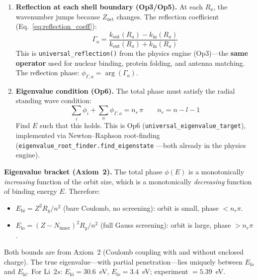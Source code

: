 \begin{enumerate}
\item \textbf{Reflection at each shell boundary (Op3/Op5).}
At each $R_a$, the wavenumber jumps because
$Z_{\text{net}}$ changes.  The reflection coefficient
(Eq.~\ref{eq:reflection_coeff}):\vspace{-4pt}
\begin{equation}
    \Gamma_a = \frac{k_{\text{out}}(R_a)
    - k_{\text{in}}(R_a)}
    {k_{\text{out}}(R_a) + k_{\text{in}}(R_a)}
\end{equation}
This is \texttt{universal\_reflection()}
from the physics engine (Op3)---the
\textbf{same operator} used for nuclear binding,
protein folding, and antenna matching.
The reflection phase: $\phi_{\Gamma,a}
= \arg(\Gamma_a)$.

\item \textbf{Eigenvalue condition (Op6).}
The total phase must satisfy the radial standing
wave condition:\vspace{-4pt}
\begin{equation}
    \boxed{\sum_i \phi_i + \sum_a \phi_{\Gamma,a}
    = n_r\,\pi}
    \qquad n_r = n - l - 1
    \label{eq:radial_eigenvalue_condition}
\end{equation}
Find $E$ such that this holds.  This is Op6
(\texttt{universal\_eigenvalue\_target}),
implemented via Newton--Raphson root-finding
(\texttt{eigenvalue\_root\_finder.find\_eigenstate}
---both already in the physics engine).
\end{enumerate}

\noindent\textbf{Eigenvalue bracket (Axiom~2).}
The total phase $\phi(E)$ is a monotonically
\emph{increasing} function of the orbit size,
which is a monotonically \emph{decreasing}
function of binding energy $E$.  Therefore:
\begin{itemize}
    \item $E_{\text{hi}} = Z^2 R_y / n^2$
          (bare Coulomb, no screening):
          orbit is small, phase $< n_r\pi$.
    \item $E_{\text{lo}} = (Z - N_{\text{inner}})^2
          R_y / n^2$ (full Gauss screening):
          orbit is large, phase $> n_r\pi$.
\end{itemize}
Both bounds are from Axiom~2 (Coulomb coupling
with and without enclosed charge).  The true
eigenvalue---with partial penetration---lies
uniquely between $E_{\text{lo}}$ and $E_{\text{hi}}$.
For Li~$2s$: $E_{\text{hi}} = 30.6$~eV,
$E_{\text{lo}} = 3.4$~eV; experiment $= 5.39$~eV.

